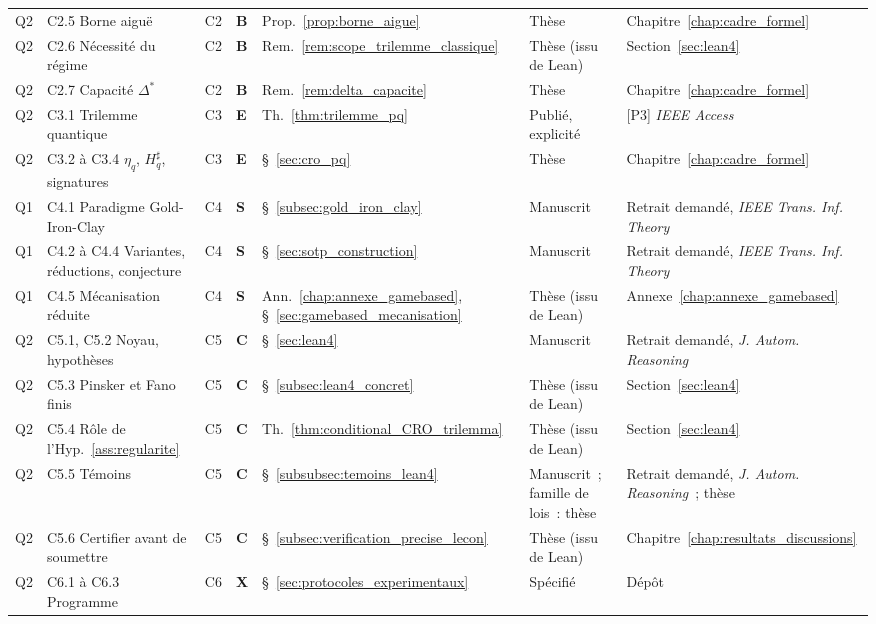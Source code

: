 \begin{sloppypar}
{\begin{longtable}{p{0.6cm}p{3.1cm}p{0.8cm}p{0.6cm}p{1.1cm}p{2.3cm}p{3.6cm}}
Q2 & C2.5 Borne aigu\"e & C2 & \textbf{B} & Prop.~\ref{prop:borne_aigue} & Th\`ese & Chapitre~\ref{chap:cadre_formel} \\
Q2 & C2.6 N\'ecessit\'e du r\'egime & C2 & \textbf{B} & Rem.~\ref{rem:scope_trilemme_classique} & Th\`ese (issu de Lean) & Section~\ref{sec:lean4} \\
Q2 & C2.7 Capacit\'e $\Delta^*$ & C2 & \textbf{B} & Rem.~\ref{rem:delta_capacite} & Th\`ese & Chapitre~\ref{chap:cadre_formel} \\
Q2 & C3.1 Trilemme quantique & C3 & \textbf{E} & Th.~\ref{thm:trilemme_pq} & Publi\'e, explicit\'e & [P3] \textit{IEEE Access}~\cite{MINKA2026PQCRO} \\
Q2 & C3.2 \`a C3.4 $\eta_q$, $H^\sharp_q$, signatures & C3 & \textbf{E} & \S~\ref{sec:cro_pq} & Th\`ese & Chapitre~\ref{chap:cadre_formel} \\
Q1 & C4.1 Paradigme Gold-Iron-Clay & C4 & \textbf{S} & \S~\ref{subsec:gold_iron_clay} & Manuscrit & Retrait demand\'e, \textit{IEEE Trans. Inf. Theory} \\
Q1 & C4.2 \`a C4.4 Variantes, r\'eductions, conjecture & C4 & \textbf{S} & \S~\ref{sec:sotp_construction} & Manuscrit & Retrait demand\'e, \textit{IEEE Trans. Inf. Theory} \\
Q1 & C4.5 M\'ecanisation r\'eduite & C4 & \textbf{S} & Ann.~\ref{chap:annexe_gamebased}, \S~\ref{sec:gamebased_mecanisation} & Th\`ese (issu de Lean) & Annexe~\ref{chap:annexe_gamebased} \\
Q2 & C5.1, C5.2 Noyau, hypoth\`eses & C5 & \textbf{C} & \S~\ref{sec:lean4} & Manuscrit & Retrait demand\'e, \textit{J. Autom. Reasoning} \\
Q2 & C5.3 Pinsker et Fano finis & C5 & \textbf{C} & \S~\ref{subsec:lean4_concret} & Th\`ese (issu de Lean) & Section~\ref{sec:lean4} \\
Q2 & C5.4 R\^ole de l'Hyp.~\ref{ass:regularite} & C5 & \textbf{C} & Th.~\ref{thm:conditional_CRO_trilemma} & Th\`ese (issu de Lean) & Section~\ref{sec:lean4} \\
Q2 & C5.5 T\'emoins & C5 & \textbf{C} & \S~\ref{subsubsec:temoins_lean4} & Manuscrit~; famille de lois~: th\`ese & Retrait demand\'e, \textit{J. Autom. Reasoning}~; th\`ese \\
Q2 & C5.6 Certifier avant de soumettre & C5 & \textbf{C} & \S~\ref{subsec:verification_precise_lecon} & Th\`ese (issu de Lean) & Chapitre~\ref{chap:resultats_discussions} \\
Q2 & C6.1 \`a C6.3 Programme & C6 & \textbf{X} & \S~\ref{sec:protocoles_experimentaux} & Sp\'ecifi\'e & D\'ep\^ot~\cite{CROTrilemmaDepot} \\
\bottomrule
\end{longtable}
}


\end{sloppypar}
